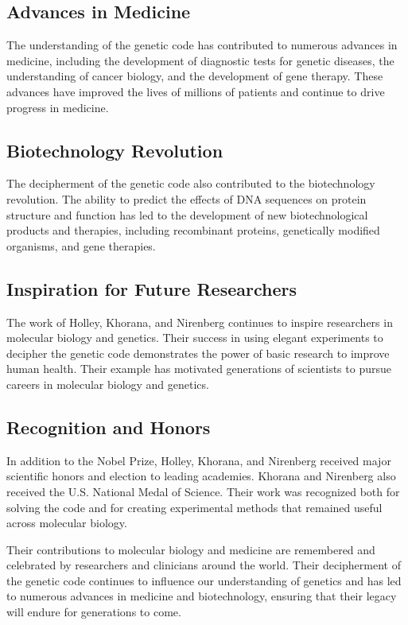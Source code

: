 \subsection{Advances in Medicine}

The understanding of the genetic code has contributed to numerous advances in medicine, including the development of diagnostic tests for genetic diseases, the understanding of cancer biology, and the development of gene therapy. These advances have improved the lives of millions of patients and continue to drive progress in medicine.

\subsection{Biotechnology Revolution}

The decipherment of the genetic code also contributed to the biotechnology revolution. The ability to predict the effects of DNA sequences on protein structure and function has led to the development of new biotechnological products and therapies, including recombinant proteins, genetically modified organisms, and gene therapies.

\subsection{Inspiration for Future Researchers}

The work of Holley, Khorana, and Nirenberg continues to inspire researchers in molecular biology and genetics. Their success in using elegant experiments to decipher the genetic code demonstrates the power of basic research to improve human health. Their example has motivated generations of scientists to pursue careers in molecular biology and genetics.

\subsection{Recognition and Honors}

In addition to the Nobel Prize, Holley, Khorana, and Nirenberg received major scientific honors and election to leading academies. Khorana and Nirenberg also received the U.S. National Medal of Science. Their work was recognized both for solving the code and for creating experimental methods that remained useful across molecular biology.

Their contributions to molecular biology and medicine are remembered and celebrated by researchers and clinicians around the world. Their decipherment of the genetic code continues to influence our understanding of genetics and has led to numerous advances in medicine and biotechnology, ensuring that their legacy will endure for generations to come.


